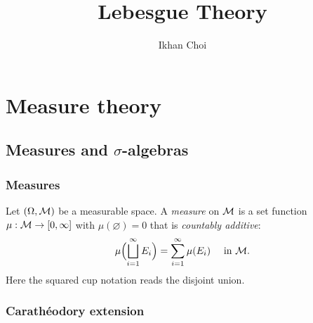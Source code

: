 \documentclass{../note}
\begin{document}
\title{Lebesgue Theory}
\author{Ikhan Choi}
\maketitle
\tableofcontents

\part{Measure theory}





\chapter{Measures and $\sigma$-algebras}


\section{Measures}

\begin{prb}
Let $(\Omega,\mathcal{M})$ be a measurable space.
A \emph{measure} on $\mathcal{M}$ is a set function $\mu:\mathcal{M}\to[0,\infty]$ with $\mu(\varnothing)=0$ that is \emph{countably additive}:
\[\mu\Bigl(\bigsqcup_{i=1}^\infty E_i\Bigr)=\sum_{i=1}^\infty\mu(E_i)\quad\text{ in }\mathcal{M}.\]
Here the squared cup notation reads the disjoint union.
\end{prb}

\begin{prb}

\end{prb}

\section{Carath\'eodory extension}
\end{document}
